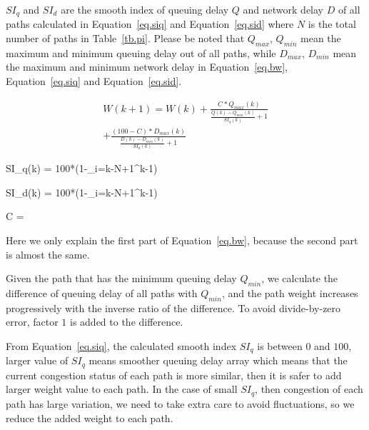 $SI_q$ and $SI_d$ are the smooth index of queuing delay $Q$ and network delay $D$ of all paths calculated in Equation~\ref{eq.siq}  and Equation~\ref{eq.sid} where $N$ is the total number of paths in Table~\ref{tb.pi}. Please be noted that $Q_{max}$, $Q_{min}$ mean the maximum and minimum queuing delay out of all paths, while $D_{max}$, $D_{min}$ mean the maximum and minimum network delay in Equation~\ref{eq.bw}, Equation~\ref{eq.siq} and Equation~\ref{eq.sid}.
%

\begin{eqnarray}
\label{eq.bw}
W(k+1) = W(k) + \frac{C*Q_{max}(k)}{\frac{Q(k)-Q_{min}(k)}{SI_q(k)}+1} \nonumber \\
\left.		  + \frac{(100-C)*D_{max}(k)}{\frac{D(k)-D_{min}(k)}{SI_d(k)}+1}\right. 
\end{eqnarray}

\be
\label{eq.siq}
SI_q(k) = 100*(1-\sum_{i=k-N+1}^{k-1})
\ee

\be
\label{eq.sid}
SI_d(k) = 100*(1-\sum_{i=k-N+1}^{k-1})
\ee

\be
\label{eq.c}
C = 
\ee

Here we only explain the first part of Equation~\ref{eq.bw}, because the second part is almost the same.

Given the path that has the minimum queuing delay $Q_{min}$, we calculate the difference of queuing delay of all paths with $Q_{min}$, and the path weight increases progressively with the inverse ratio of the difference. To avoid divide-by-zero error, factor $1$ is added to the difference.

From Equation~\ref{eq.siq}, the calculated smooth index $SI_q$ is between $0$ and $100$, larger value of $SI_q$ means smoother queuing delay array which means that the current congestion status of each path is more similar, then it is safer to add larger weight value to each path. In the case of small $SI_q$, then congestion of each path has large variation, we need to take extra care to avoid fluctuations, so we reduce the added weight to each path.


